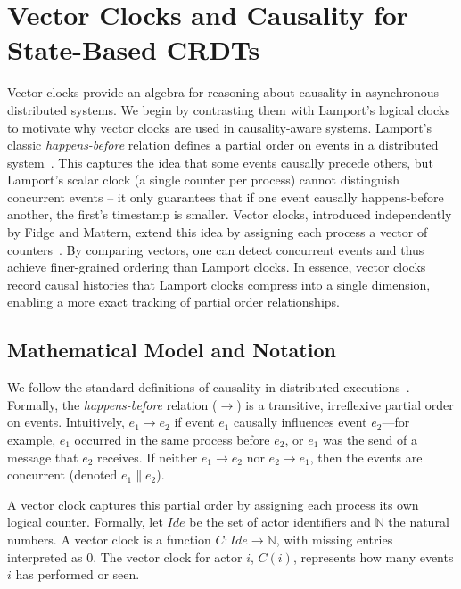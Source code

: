 

\chapter{Vector Clocks and Causality for State-Based CRDTs}\label{chap:vectors}

Vector clocks provide an algebra for reasoning about causality in asynchronous distributed systems. We begin by contrasting them with Lamport’s logical clocks to motivate why vector clocks are used in causality-aware systems. Lamport’s classic \emph{happens-before} relation defines a partial order on events in a distributed system~\cite{lamport1978time}. This captures the idea that some events causally precede others, but Lamport’s scalar clock (a single counter per process) cannot distinguish concurrent events – it only guarantees that if one event causally happens-before another, the first’s timestamp is smaller. Vector clocks, introduced independently by Fidge and Mattern, extend this idea by assigning each process a vector of counters~\cite{fidge1988timestamps,mattern1989virtual}. By comparing vectors, one can detect concurrent events and thus achieve finer-grained ordering than Lamport clocks. In essence, vector clocks record causal histories that Lamport clocks compress into a single dimension, enabling a more exact tracking of partial order relationships.

\section{Mathematical Model and Notation}

We follow the standard definitions of causality in distributed executions~\cite{lamport1978time,fidge1988timestamps,mattern1989virtual}. Formally, the \emph{happens-before} relation ($\to$) is a transitive, irreflexive partial order on events. Intuitively, $e_1 \to e_2$ if event $e_1$ causally influences event $e_2$—for example, $e_1$ occurred in the same process before $e_2$, or $e_1$ was the send of a message that $e_2$ receives. If neither $e_1 \to e_2$ nor $e_2 \to e_1$, then the events are concurrent (denoted $e_1 \parallel e_2$).

A vector clock captures this partial order by assigning each process its own logical counter. Formally, let $Ide$ be the set of actor identifiers and $\mathbb{N}$ the natural numbers. A vector clock is a function $C: Ide \to \mathbb{N}$, with missing entries interpreted as 0. The vector clock for actor $i$, $C(i)$, represents how many events $i$ has performed or seen.


